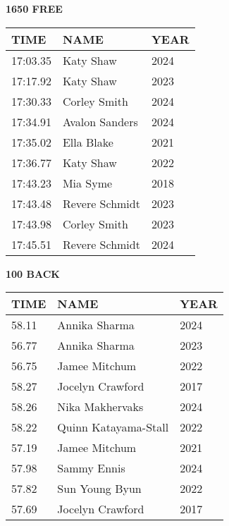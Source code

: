\begin{minipage}[t]{0.48\textwidth}
\centering
\textbf{1650 FREE}\\[0.05cm]
\begin{tabular}{@{}p{1.8cm}p{2.8cm}p{1.2cm}@{}}
\hline
\textbf{TIME} & \textbf{NAME} & \textbf{YEAR} \\
\hline
17:03.35 & Katy Shaw & 2024 \\
17:17.92 & Katy Shaw & 2023 \\
17:30.33 & Corley Smith & 2024 \\
17:34.91 & Avalon Sanders & 2024 \\
17:35.02 & Ella Blake & 2021 \\
17:36.77 & Katy Shaw & 2022 \\
17:43.23 & Mia Syme & 2018 \\
17:43.48 & Revere Schmidt & 2023 \\
17:43.98 & Corley Smith & 2023 \\
17:45.51 & Revere Schmidt & 2024 \\
\hline
\end{tabular}
\end{minipage}\hfill
\begin{minipage}[t]{0.48\textwidth}
\centering
\textbf{100 BACK}\\[0.05cm]
\begin{tabular}{@{}p{1.8cm}p{2.8cm}p{1.2cm}@{}}
\hline
\textbf{TIME} & \textbf{NAME} & \textbf{YEAR} \\
\hline
58.11 & Annika Sharma & 2024 \\
56.77 & Annika Sharma & 2023 \\
56.75 & Jamee Mitchum & 2022 \\
58.27 & Jocelyn Crawford & 2017 \\
58.26 & Nika Makhervaks & 2024 \\
58.22 & Quinn Katayama-Stall & 2022 \\
57.19 & Jamee Mitchum & 2021 \\
57.98 & Sammy Ennis & 2024 \\
57.82 & Sun Young Byun & 2022 \\
57.69 & Jocelyn Crawford & 2017 \\
\hline
\end{tabular}
\end{minipage}

\vspace{0.4cm}

